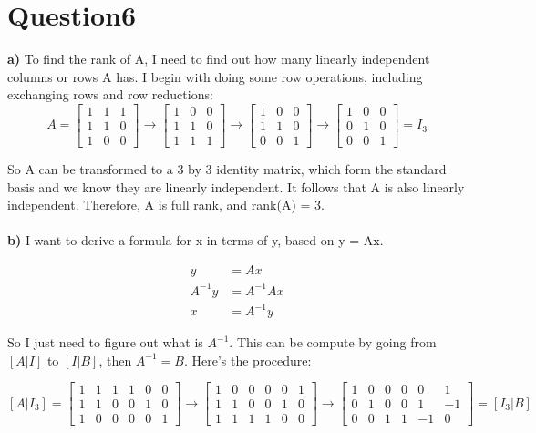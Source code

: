 \documentclass[paper=a4, fontsize=11pt]{scrartcl} %
\numberwithin{equation}{section} %
\numberwithin{figure}{section} %
\numberwithin{table}{section} %
\begin{document}
\section*{Question6}
\textbf{a)} To find the rank of A, I need to find out how many linearly independent columns or rows A has. I begin with doing some row operations, including exchanging rows and row reductions: 
$$
A = 
\begin{bmatrix}
1 & 1 & 1 \\
1 & 1 & 0 \\
1 & 0 & 0 
\end{bmatrix}
\rightarrow
\begin{bmatrix}
1 & 0 & 0 \\
1 & 1 & 0 \\
1 & 1 & 1 
\end{bmatrix}
\rightarrow
\begin{bmatrix}
1 & 0 & 0 \\
1 & 1 & 0 \\
0 & 0 & 1 
\end{bmatrix}
\rightarrow
\begin{bmatrix}
1 & 0 & 0 \\
0 & 1 & 0 \\
0 & 0 & 1 
\end{bmatrix}
=
I_3
$$

So A can be transformed to a 3 by 3 identity matrix, which form the standard basis and we know they are linearly independent. It follows that A is also linearly independent. Therefore, A is full rank, and rank(A) = 3. \\\\

\textbf{b)} I want to derive a formula for x in terms of y, based on y = Ax. 

\begin{align*} 
y &=  A x \\ 
A^{-1} y &=  A^{-1} A x \\
x &= A^{-1} y 
\end{align*}

So I just need to figure out what is $A^{-1}$. This can be compute by going from $[A|I]$ to $[I|B]$, then $A^{-1} = B$. Here's the procedure: 

$$
[A|I_3] = 
\begin{bmatrix}
1 & 1 & 1 & 1 & 0 & 0 \\
1 & 1 & 0 & 0 & 1 & 0 \\
1 & 0 & 0 & 0 & 0 & 1
\end{bmatrix}
\rightarrow
\begin{bmatrix}
1 & 0 & 0 & 0 & 0 & 1 \\
1 & 1 & 0 & 0 & 1 & 0 \\
1 & 1 & 1 & 1 & 0 & 0 
\end{bmatrix}
\rightarrow
\begin{bmatrix}
1 & 0 & 0 & 0 & 0 & 1 \\
0 & 1 & 0 & 0 & 1 & -1 \\
0 & 0 & 1 & 1 & -1 & 0 
\end{bmatrix}
=
[I_3|B]
$$
\end{document}
